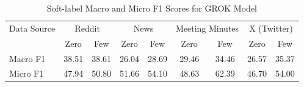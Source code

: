 \begin{table}[htbp]
\centering
\begin{tabular}{l *{8}{c}}
\toprule
Data Source & \multicolumn{2}{c}{Reddit} & \multicolumn{2}{c}{News} & \multicolumn{2}{c}{Meeting Minutes} & \multicolumn{2}{c}{X (Twitter)} \\
& Zero & Few & Zero & Few & Zero & Few & Zero & Few \\
\midrule
Macro F1 & 38.51 & 38.61 & 26.04 & 28.69 & 29.46 & 34.46 & 26.57 & 35.37 \\
Micro F1 & 47.94 & 50.80 & 51.66 & 54.10 & 48.63 & 62.39 & 46.70 & 54.00 \\
\bottomrule
\end{tabular}
\centering\caption{Soft-label Macro and Micro F1 Scores for GROK Model}
\label{tab:grok_macro_micro}
\end{table}